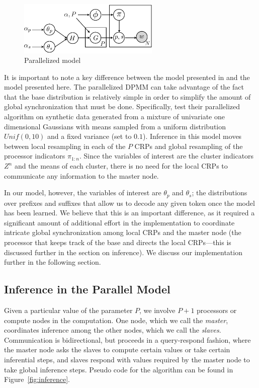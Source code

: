 \begin{figure}[h]
  \centering
  \includegraphics[width=0.6\textwidth]{fig/v3}
  \caption{Parallelized model}
  \label{fig:v3}
\end{figure}

It is important to note a key difference between the model presented
in \cite{williamson2013} and the model presented here. The
parallelized DPMM can take advantage of the fact that the base
distribution is relatively simple in order to simplify the amount of
global synchronization that must be done. Specifically,
\cite{williamson2013} test their parallelized algorithm on synthetic
data generated from a mixture of univariate one dimensional Gaussians
with means sampled from a uniform distribution $Unif(0, 10)$ and a
fixed variance (set to $0.1$). Inference in this model moves between
local resampling in each of the $P$ CRPs and global resampling of the
processor indicators $\pi_{1:n}$. Since the variables of interest are
the cluster indicators $Z^n$ and the means of each cluster, there is
no need for the local CRPs to communicate any information to the
master node.

In our model, however, the variables of interest are $\theta_p$ and
$\theta_s$; the distributions over prefixes and suffixes that allow us
to decode any given token once the model has been learned. We believe
that this is an important difference, as it required a significant
amount of additional effort in the implementation to coordinate
intricate global synchronization among local CRPs and the master node
(the processor that keeps track of the base and directs the local
CRPs---this is discussed further in the section on inference). We
discuss our implementation further in the following section.

\subsection{Inference in the Parallel Model}

Given a particular value of the parameter $P$, we involve $P + 1$
processors or compute nodes in the computation. One node, which we
call the \textit{master}, coordinates inference among the other nodes,
which we call the \textit{slaves}. Communication is bidirectional, but
proceeds in a query-respond fashion, where the master node asks the
slaves to compute certain values or take certain inferential steps,
and slaves respond with values required by the master node to take
global inference steps. Pseudo code for the algorithm can be found in
Figure~\ref{fig:inference}.

